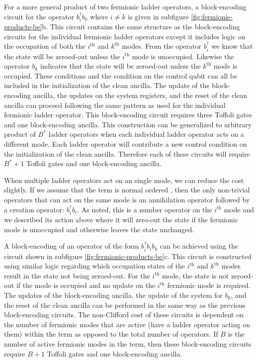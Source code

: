 For a more general product of two fermionic ladder operators, a block-encoding circuit for the operator $b_i^\dagger b_k$ where $i \neq k$ is given in subfigure \ref{fig:fermionic-products-be}b.
This circuit contains the same structure as the block-encoding circuits for the individual fermionic ladder operators except it includes logic on the occupation of both the $i^\text{th}$ and $k^\text{th}$ modes.
From the operator $b_i^\dagger$ we know that the state will be zeroed-out unless the $i^\text{th}$ mode is unoccupied.
Likewise the operator $b_k$ indicates that the state will be zeroed-out unless the $k^\text{th}$ mode is occupied.
These conditions and the condition on the control qubit can all be included in the initialization of the clean ancilla.
The update of the block-encoding ancilla, the updates on the system registers, and the reset of the clean ancilla can proceed following the same pattern as used for the individual fermionic ladder operator.
This block-encoding circuit requires three Toffoli gates and one block-encoding ancilla.
This construction can be generalized to arbitrary product of $B^*$ ladder operators when each individual ladder operator acts on a different mode.
Each ladder operator will contribute a new control condition on the initialization of the clean ancilla.
Therefore each of these circuits will require $B^* + 1$ Toffoli gates and one block-encoding ancilla.

When multiple ladder operators act on an single mode, we can reduce the cost slightly.
If we assume that the term is normal ordered , then the only non-trivial operators that can act on the same mode is an annihilation operator followed by a creation operator: $b_i^\dagger b_i$.
As noted, this is a number operator on the $i^\text{th}$ mode and we described its action above where it will zero-out the state if the fermionic mode is unoccupied and otherwise leaves the state unchanged.

A block-encoding of an operator of the form $b_i^\dagger b_i b_k$ can be achieved using the circuit shown in subfigure \ref{fig:fermionic-products-be}c.
This circuit is constructed using similar logic regarding which occupation states of the $i^\text{th}$ and $k^\text{th}$ modes result in the state not being zeroed-out.
For the $i^\text{th}$ mode, the state is not zeroed-out if the mode is occupied and no update on the $i^\text{th}$ fermionic mode is required. 
The updates of the block-encoding ancilla, the update of the system for $b_k$, and the reset of the clean ancilla can be performed in the same way as the previous block-encoding circuits.
The non-Clifford cost of these circuits is dependent on the number of fermionic modes that are active (have a ladder operator acting on them) within the term as opposed to the total number of operators.
If $B$ is the number of active fermionic modes in the term, then these block-encoding circuits require $B + 1$ Toffoli gates and one block-encoding ancilla. 


